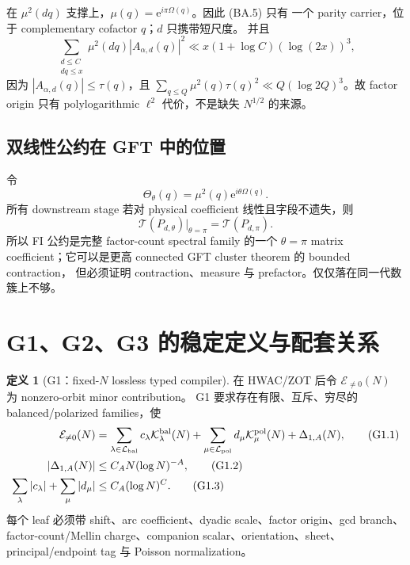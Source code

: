 \documentclass[11pt,a4paper]{ctexart}
\theoremstyle{definition}
\newtheorem{definition}[theorem]{定义}
\newcommand{\e}{\mathrm e}
\newcommand{\1}{\mathbf 1}
\begin{document}
在 $\mu^2(dq)$ 支撑上，$\mu(q)=\e^{i\pi\Omega(q)}$。因此 (BA.5) 只有
一个 parity carrier，位于 complementary cofactor $q$；$d$ 只携带短尺度。
并且
\[
 \sum_{\substack{d\le C\\dq\le x}}\mu^2(dq)|A_{\alpha,d}(q)|^2
 \ll x(1+\log C)(\log(2x))^3,                       \tag{BA.6}
\]
因为 $|A_{\alpha,d}(q)|\le\tau(q)$，且
$\sum_{q\le Q}\mu^2(q)\tau(q)^2\ll Q(\log 2Q)^3$。故 factor origin
只有 polylogarithmic $\ell^2$ 代价，不是缺失 $N^{1/2}$ 的来源。

\subsection{双线性公约在 GFT 中的位置}

令
\[
 \Theta_\theta(q)=\mu^2(q)\e^{i\theta\Omega(q)}.
\]
所有 downstream stage 若对 physical coefficient 线性且字段不遗失，则
\[
 \mathcal T(P_{d,\theta})|_{\theta=\pi}=\mathcal T(P_{d,\pi}).\tag{BA.7}
\]
所以 FI 公约是完整 factor-count spectral family 的一个 $\theta=\pi$ matrix
coefficient；它可以是更高 connected GFT cluster theorem 的 bounded contraction，
但必须证明 contraction、measure 与 prefactor。仅仅落在同一代数簇上不够。

\section{G1、G2、G3 的稳定定义与配套关系}
\label{sec:g123}

\begin{definition}[G1：fixed-$N$ lossless typed compiler]
在 HWAC/ZOT 后令 $\mathcal E_{\ne0}(N)$ 为 nonzero-orbit minor contribution。
G1 要求存在有限、互斥、穷尽的 balanced/polarized families，使
\begin{align}
 \mathcal E_{\ne0}(N)
 &=\sum_{\lambda\in\mathcal L_{\rm bal}}c_\lambda
   \mathcal K_\lambda^{\rm bal}(N)
  +\sum_{\mu\in\mathcal L_{\rm pol}}d_\mu
   \mathcal K_\mu^{\rm pol}(N)+\Delta_{1,A}(N),      \tag{G1.1}\\
 |\Delta_{1,A}(N)|&\le C_AN(\log N)^{-A},             \tag{G1.2}\\
 \sum_\lambda|c_\lambda|+\sum_\mu|d_\mu|
 &\le C_A(\log N)^C.                                 \tag{G1.3}
\end{align}
每个 leaf 必须带 shift、arc coefficient、dyadic scale、factor origin、gcd
branch、factor-count/Mellin charge、companion scalar、orientation、sheet、
principal/endpoint tag 与 Poisson normalization。
\end{definition}
\end{document}
